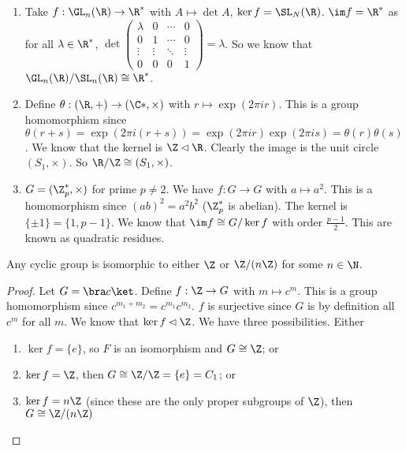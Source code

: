 \documentclass[a4paper]{article}
\begin{document}
\begin{eg}\leavevmode
  \begin{enumerate}
    \item Take $f: \GL_n(\R) \to \R^*$ with $A \mapsto \det A$, $\ker f = \SL_N(\R)$. $\im f = \R^*$ as for all $\lambda \in \R^*$, $\det
      \begin{pmatrix}
        \lambda & 0 & \cdots & 0 \\
        0 &1 & \cdots & 0\\
        \vdots &\vdots &\ddots & \vdots\\
        0& 0 & 0 &1
      \end{pmatrix}
      = \lambda$. So we know that $\GL_n(\R)/\SL_n(\R) \cong \R^*$.
    \item Define $\theta: (\R, +) \to (\C*, \times)$ with $r\mapsto \exp(2\pi ir)$. This is a group homomorphism since $\theta(r + s) = \exp(2\pi i(r + s)) = \exp (2\pi i r)\exp (2\pi i s) = \theta(r)\theta(s)$. We know that the kernel is $\Z\lhd \R$. Clearly the image is the unit circle $(S_1, \times)$. So $\R/\Z \cong (S_1, \times)$.
    \item $G = (\Z_p^*, \times)$ for prime $p\not= 2$. We have $f: G\to G$ with $a\mapsto a^2$. This is a homomorphism since $(ab)^2 = a^2b^2$ ($\Z_p^*$ is abelian). The kernel is $\{\pm 1\} = \{1, p - 1\}$. We know that $\im f\cong G/\ker f$ with order $\frac{p - 1}{2}$. This are known as quadratic residues.
  \end{enumerate}
\end{eg}

\begin{lemma}
  Any cyclic group is isomorphic to either $\Z$ or $\Z/(n\Z)$ for some $n\in \N$.
\end{lemma}

\begin{proof}
  Let $G = \bra c\ket$. Define $f: \Z \to G$ with $m\mapsto c^m$. This is a group homomorphism since $c^{m_1 + m_2} = c^{m_1}c^{m_2}$. $f$ is surjective since $G$ is by definition all $c^m$ for all $m$. We know that $\ker f\lhd \Z$. We have three possibilities. Either
  \begin{enumerate}
    \item $\ker f = \{e\}$, so $F$ is an isomorphism and $G\cong \Z$; or
    \item $\ker f = \Z$, then $G\cong \Z/\Z = \{e\} = C_1$; or
    \item $\ker f = n\Z$ (since these are the only proper subgroups of $\Z$), then $G\cong \Z/(n\Z)$
  \end{enumerate}
\end{proof}
\end{document}
